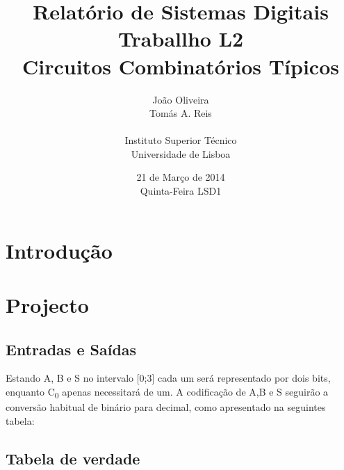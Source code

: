\documentclass[a4paper,12pt]{article}
\begin{document}
\renewcommand{\sfdefault}{lmss}
\renewcommand{\familydefault}{\sfdefault}
\selectfont

\title{\bf Relatório de Sistemas Digitais \\
Traballho L2\\
Circuitos Combinatórios Típicos}
\author{João Oliveira\\
Tomás A. Reis\\
\\
Instituto Superior Técnico \\
Universidade de Lisboa}
\date{21 de Março de 2014 \\
Quinta-Feira LSD1}
\maketitle

\pagebreak
\section{Introdução}

\section{Projecto}

\subsection{Entradas e Saídas}
Estando A, B e S no intervalo [0;3] cada um será representado por dois bits, enquanto C\textsubscript{0} apenas necessitará de um. A codificação de A,B e S seguirão a conversão habitual de binário para decimal, como apresentado na seguintes tabela:


\subsection{Tabela de verdade}
 
\end{document}
